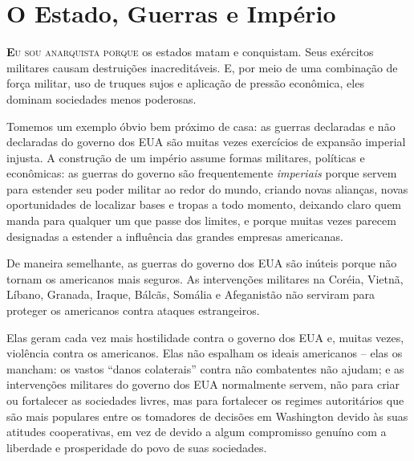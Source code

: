 
\chapter{O Estado, Guerras e Império}
\label{chap:4}

\lettrine[lines=2]{\textcolor{LettrineColor}{\textbf{E}}}{u sou anarquista porque} os estados matam e conquistam. Seus exércitos militares causam destruições inacreditáveis. E, por meio de uma combinação de força militar, uso de truques sujos e aplicação de pressão econômica, eles dominam sociedades menos poderosas.

Tomemos um exemplo óbvio bem próximo de casa: as guerras declaradas e não declaradas do governo dos EUA são muitas vezes exercícios de expansão imperial injusta. A construção de um império assume formas militares, políticas e econômicas: as guerras do governo são frequentemente \emph{imperiais} porque servem para estender seu poder militar ao redor do mundo, criando novas alianças, novas oportunidades de localizar bases e tropas a todo momento, deixando claro quem manda para qualquer um que passe dos limites, e porque muitas vezes parecem designadas a estender a influência das grandes empresas americanas.

De maneira semelhante, as guerras do governo dos EUA são inúteis porque não tornam os americanos mais seguros. As intervenções militares na Coréia, Vietnã, Líbano, Granada, Iraque, Bálcãs, Somália e Afeganistão não serviram para proteger os americanos contra ataques estrangeiros.

Elas geram cada vez mais hostilidade contra o governo dos EUA e, muitas vezes, violência contra os americanos. Elas não espalham os ideais americanos -- elas os mancham: os vastos ``danos colaterais'' contra não combatentes não ajudam; e as intervenções militares do governo dos EUA normalmente servem, não para criar ou fortalecer as sociedades livres, mas para fortalecer os regimes autoritários que são mais populares entre os tomadores de decisões em Washington devido às suas atitudes cooperativas, em vez de devido a algum compromisso genuíno com a liberdade e prosperidade do povo de suas sociedades.

